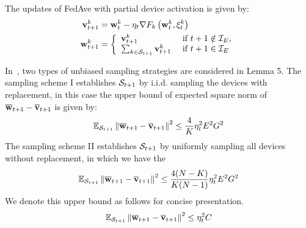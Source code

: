 The updates of FedAve with partial device activation is given by: 
\begin{align} 
\mathbf{v}_{t+1}^{k} &=\mathbf{w}_{t}^{k}-\eta_{t} \nabla F_{k}\left(\mathbf{w}_{t}^{k}, \xi_{t}^{k}\right) \\ \mathbf{w}_{t+1}^{k} &=\left\{\begin{array}{ll}\mathbf{v}_{t+1}^{k} & \text { if } t+1 \notin \mathcal{I}_{E}, \\ 
\sum_{k \in {\mathcal{S}}_{t+1}} \mathbf{v}_{t+1}^{k} & \text { if } t+1 \in \mathcal{I}_{E}\end{array}\right.
\end{align}

In~\cite{li2019convergence}, two types of unbiased sampling strategies are considered in Lemma 5. 
The sampling scheme I establishes ${\mathcal{S}}_{t+1}$ by i.i.d. sampling the devices with replacement,
in this case the upper bound of expected square norm of ${\overline{\mathbf{w}}}_{t+1} - {\overline{\mathbf{v}}}_{t+1}$ is given by:
\begin{align}
\mathbb{E}_{{\mathcal{S}}_{t+1}}\left\|{\overline{\mathbf{w}}}_{t+1} - {\overline{\mathbf{v}}}_{t+1}\right\|^2	\leq \frac{4}{K} \eta_t^2 E^2G^2
\end{align}
The sampling scheme II establishes ${\mathcal{S}}_{t+1}$ by uniformly sampling all devices without
replacement, in which we have the 
\begin{align}
\mathbb{E}_{{\mathcal{S}}_{t+1}}\left\|{\overline{\mathbf{w}}}_{t+1} - {\overline{\mathbf{v}}}_{t+1}\right\|^2	\leq \frac{4(N - K)}{K(N-1)} \eta_t^2 E^2G^2
\end{align}
We denote this upper bound as follows for concise presentation. 
\begin{align}
	\mathbb{E}_{{\mathcal{S}}_{t+1}}\left\|{\overline{\mathbf{w}}}_{t+1} - {\overline{\mathbf{v}}}_{t+1}\right\|^2 \leq  \eta_t^2 C
	\label{eq:partialsample}
\end{align}




